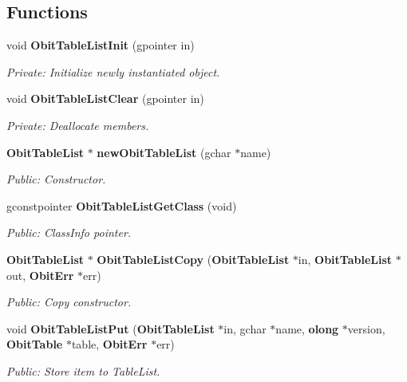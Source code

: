 \subsection*{Functions}
\begin{CompactItemize}
\item 
void {\bf Obit\-Table\-List\-Init} (gpointer in)
\begin{CompactList}\small\item\em Private: Initialize newly instantiated object. \item\end{CompactList}\item 
void {\bf Obit\-Table\-List\-Clear} (gpointer in)
\begin{CompactList}\small\item\em Private: Deallocate members. \item\end{CompactList}\item 
{\bf Obit\-Table\-List} $\ast$ {\bf new\-Obit\-Table\-List} (gchar $\ast$name)
\begin{CompactList}\small\item\em Public: Constructor. \item\end{CompactList}\item 
gconstpointer {\bf Obit\-Table\-List\-Get\-Class} (void)
\begin{CompactList}\small\item\em Public: Class\-Info pointer. \item\end{CompactList}\item 
{\bf Obit\-Table\-List} $\ast$ {\bf Obit\-Table\-List\-Copy} ({\bf Obit\-Table\-List} $\ast$in, {\bf Obit\-Table\-List} $\ast$out, {\bf Obit\-Err} $\ast$err)
\begin{CompactList}\small\item\em Public: Copy constructor. \item\end{CompactList}\item 
void {\bf Obit\-Table\-List\-Put} ({\bf Obit\-Table\-List} $\ast$in, gchar $\ast$name, {\bf olong} $\ast$version, {\bf Obit\-Table} $\ast$table, {\bf Obit\-Err} $\ast$err)
\begin{CompactList}\small\item\em Public: Store item to Table\-List. \item\end{CompactList}\item 

\end{CompactItemize}

